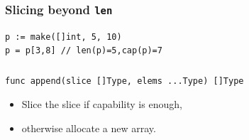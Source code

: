 \documentclass[xetex,mathserif,serif,12pt]{beamer}
\begin{document}
\begin{frame}[fragile]
  \frametitle{Slicing beyond \texttt{len}}

  \begin{beamer@nomargin}
    \begin{lstlisting}
p := make([]int, 5, 10)
p = p[3,8] // len(p)=5,cap(p)=7
    \end{lstlisting}
  \end{beamer@nomargin}
\end{frame}


\begin{frame}[fragile]
\frametitle{}

  \begin{beamer@nomargin}
    \begin{lstlisting}
func append(slice []Type, elems ...Type) []Type
    \end{lstlisting}
  \end{beamer@nomargin}

  \begin{itemize}
  \item Slice the slice if capability is enough,
  \item otherwise allocate a new array.
  \end{itemize}
\end{frame}
\end{document}
